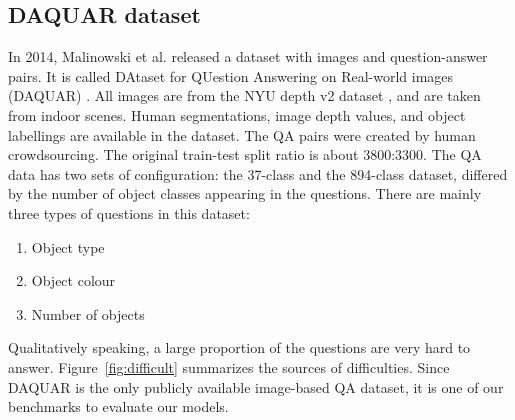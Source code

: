 \subsection{DAQUAR dataset}
\label{background_daquar}
In 2014, Malinowski et al. released a dataset with images and question-answer pairs. It is called DAtaset for QUestion Answering on Real-world images (DAQUAR) \cite{malinowski14a}. All images are from the NYU depth v2 dataset \cite{silberman12}, and are taken from indoor scenes. Human segmentations, image depth values, and object labellings are available in the dataset. The QA pairs were created by human crowdsourcing. The original train-test split ratio is about 3800:3300. The QA data has two sets of configuration: the 37-class and the 894-class dataset, differed by the number of object classes appearing in the questions. There are mainly three types of questions in this dataset:
\begin{enumerate}
	\item Object type
	\item Object colour
	\item Number of objects
\end{enumerate}
Qualitatively speaking, a large proportion of the questions are very hard to answer. Figure~\ref{fig:difficult} summarizes the sources of difficulties. Since DAQUAR is the only publicly available image-based QA dataset, it is one of our benchmarks to evaluate our models.

